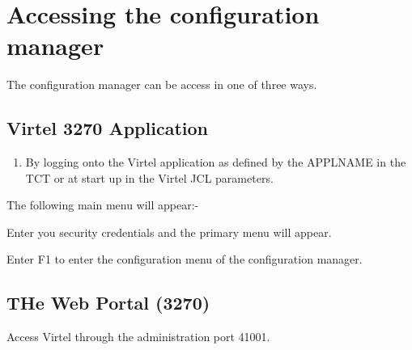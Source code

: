 \documentclass[letterpaper,10pt,english]{sphinxmanual}
\begin{document}
\section{Accessing the configuration manager}
\label{\detokenize{connectivity_guide:accessing-the-configuration-manager}}
The configuration manager can be access in one of three ways.


\subsection{Virtel 3270 Application}
\label{\detokenize{connectivity_guide:virtel-3270-application}}\begin{enumerate}
\item {} 
By logging onto the Virtel application as defined by the APPLNAME in the TCT or at start up in the Virtel JCL parameters.

\end{enumerate}

\begin{sphinxVerbatim}[commandchars=\\\{\}]
 
\end{sphinxVerbatim}

The following main menu will appear:-


Enter you security credentials and the primary menu will appear.


\newpage

Enter F1 to enter the configuration menu of the configuration manager.


\newpage


\subsection{THe Web Portal (3270)}
\label{\detokenize{connectivity_guide:the-web-portal-3270}}
Access Virtel through the administration port 41001.

\begin{sphinxVerbatim}[commandchars=\\\{\}]
\end{sphinxVerbatim}
\end{document}
